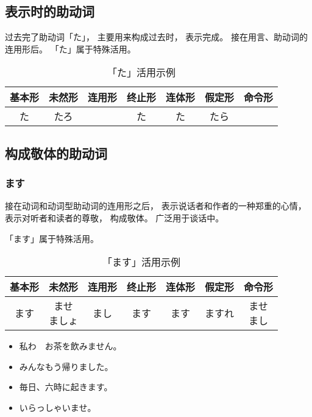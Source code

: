 \subsection{表示时的助动词}

过去完了助动词「た」，
主要用来构成过去时，
表示完成。
接在用言、助动词的连用形后。
「た」属于特殊活用。

\begin{table}[h]
  \centering
  \caption{「た」活用示例}
  \begin{tabular}{c c c c c c c}
    基本形 & 未然形 & 连用形 & 终止形 & 连体形 & 假定形 & 命令形 \\
    \hline
    た & たろ & & た & た & たら & \\
  \end{tabular}
\end{table}


\subsection{构成敬体的助动词}%

\subsubsection{ます}%

接在动词和动词型助动词的连用形之后，
表示说话者和作者的一种郑重的心情，
表示对听者和读者的尊敬，
构成敬体。
广泛用于谈话中。

「ます」属于特殊活用。

\begin{table}[h]
  \centering
  \caption{「ます」活用示例}
  \begin{tabular}{c c c c c c c}
    基本形 & 未然形 & 连用形 & 终止形 & 连体形 & 假定形 & 命令形 \\
    \hline
    ます & \makecell{ませ \\ ましょ} & まし & ます & ます & ますれ & \makecell{ませ \\ まし} \\
  \end{tabular}
\end{table}

\begin{itemize}
  \item 私わ　お茶を飲みません。
  \item みんなもう帰りました。
  \item 毎日、六時に起きます。
  \item いらっしゃいませ。
\end{itemize}


